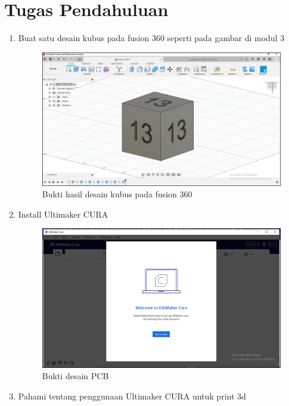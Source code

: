 \section*{Tugas Pendahuluan}
\begin{enumerate}
  \item Buat satu desain kubus pada fusion 360 seperti pada gambar di modul 3 \\
  \begin{figure}[H]
    \centering
    \includegraphics[width=0.7\linewidth]{img/modul_3/tupen3_kubus.jpg}
    \caption{Bukti hasil desain kubus pada fusion 360} 
  \end{figure}
  \item Install Ultimaker CURA \\
  \begin{figure}[H]
    \centering
    \includegraphics[width=0.6\linewidth]{img/modul_3/tupen3_install_cura.jpg}
    \caption{Bukti desain PCB\label{fig:inisub1}}
  \end{figure}
  \item Pahami tentang penggunaan Ultimaker CURA untuk print 3d \\
\end{enumerate}
  

